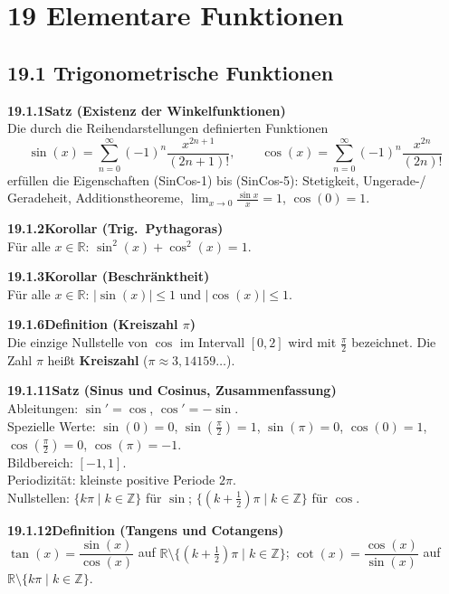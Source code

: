 \documentclass[a4paper,12pt]{article}
\newcommand{\gentry}[3]{%
  \noindent\textbf{#1\quad #2}\nopagebreak\\[0.2em]
  #3\par\smallskip
}
\begin{document}
\section*{19 \quad Elementare Funktionen}

\subsection*{19.1 \quad Trigonometrische Funktionen}

\gentry{19.1.1}{Satz (Existenz der Winkelfunktionen)}{%
  Die durch die Reihendarstellungen definierten Funktionen
  \[
    \sin(x) = \sum_{n=0}^{\infty}(-1)^n\frac{x^{2n+1}}{(2n+1)!}, \qquad
    \cos(x) = \sum_{n=0}^{\infty}(-1)^n\frac{x^{2n}}{(2n)!}
  \]
  erfüllen die Eigenschaften (SinCos-1) bis (SinCos-5): Stetigkeit, Ungerade-/
  Geradeheit, Additionstheoreme, $\lim_{x\to 0}\frac{\sin x}{x}=1$, $\cos(0)=1$.
}

\gentry{19.1.2}{Korollar (Trig.\ Pythagoras)}{%
  Für alle $x \in \mathbb{R}$: $\sin^2(x) + \cos^2(x) = 1$.
}

\gentry{19.1.3}{Korollar (Beschränktheit)}{%
  Für alle $x \in \mathbb{R}$: $|\sin(x)| \le 1$ und $|\cos(x)| \le 1$.
}

\gentry{19.1.6}{Definition (Kreiszahl $\pi$)}{%
  Die einzige Nullstelle von $\cos$ im Intervall $[0,2]$ wird mit $\frac{\pi}{2}$
  bezeichnet. Die Zahl $\pi$ heißt \textbf{Kreiszahl} ($\pi \approx 3{,}14159\ldots$).
}

\gentry{19.1.11}{Satz (Sinus und Cosinus, Zusammenfassung)}{%
  Ableitungen: $\sin' = \cos$, $\cos' = -\sin$.\\
  Spezielle Werte: $\sin(0)=0$, $\sin(\frac{\pi}{2})=1$, $\sin(\pi)=0$,
  $\cos(0)=1$, $\cos(\frac{\pi}{2})=0$, $\cos(\pi)=-1$.\\
  Bildbereich: $[-1,1]$.\\
  Periodizität: kleinste positive Periode $2\pi$.\\
  Nullstellen: $\{k\pi \mid k\in\mathbb{Z}\}$ für $\sin$;
  $\{(k+\tfrac{1}{2})\pi \mid k\in\mathbb{Z}\}$ für $\cos$.
}

\gentry{19.1.12}{Definition (Tangens und Cotangens)}{%
  $\tan(x) = \dfrac{\sin(x)}{\cos(x)}$ auf $\mathbb{R}\setminus\{(k+\tfrac{1}{2})\pi \mid k\in\mathbb{Z}\}$;
  \quad $\cot(x) = \dfrac{\cos(x)}{\sin(x)}$ auf $\mathbb{R}\setminus\{k\pi \mid k\in\mathbb{Z}\}$.
}
\end{document}
